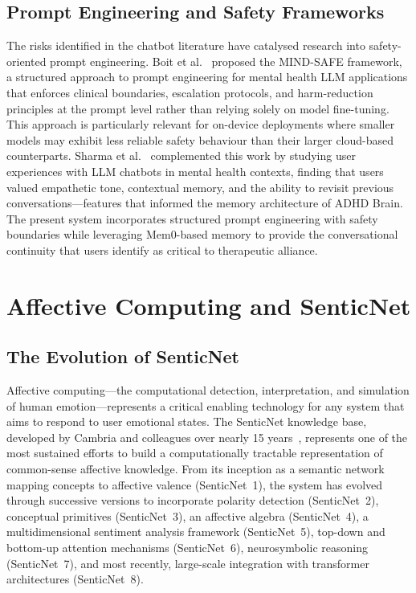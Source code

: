 \subsection{Prompt Engineering and Safety Frameworks}
\label{sec:litrev_prompt_safety}

The risks identified in the chatbot literature have catalysed research into safety-oriented prompt engineering. Boit et al.~\cite{boit2025} proposed the MIND-SAFE framework, a structured approach to prompt engineering for mental health LLM applications that enforces clinical boundaries, escalation protocols, and harm-reduction principles at the prompt level rather than relying solely on model fine-tuning. This approach is particularly relevant for on-device deployments where smaller models may exhibit less reliable safety behaviour than their larger cloud-based counterparts. Sharma et al.~\cite{sharma2024} complemented this work by studying user experiences with LLM chatbots in mental health contexts, finding that users valued empathetic tone, contextual memory, and the ability to revisit previous conversations---features that informed the memory architecture of ADHD Brain. The present system incorporates structured prompt engineering with safety boundaries while leveraging Mem0-based memory to provide the conversational continuity that users identify as critical to therapeutic alliance.

\section{Affective Computing and SenticNet}
\label{sec:litrev_affective}

\subsection{The Evolution of SenticNet}
\label{sec:litrev_senticnet_evolution}

Affective computing---the computational detection, interpretation, and simulation of human emotion---represents a critical enabling technology for any system that aims to respond to user emotional states. The SenticNet knowledge base, developed by Cambria and colleagues over nearly 15 years~\cite{cambria2010, cambria2016, cambria2020, cambria2022, cambria2024}, represents one of the most sustained efforts to build a computationally tractable representation of common-sense affective knowledge. From its inception as a semantic network mapping concepts to affective valence (SenticNet~1), the system has evolved through successive versions to incorporate polarity detection (SenticNet~2), conceptual primitives (SenticNet~3), an affective algebra (SenticNet~4), a multidimensional sentiment analysis framework (SenticNet~5), top-down and bottom-up attention mechanisms (SenticNet~6), neurosymbolic reasoning (SenticNet~7), and most recently, large-scale integration with transformer architectures (SenticNet~8).

